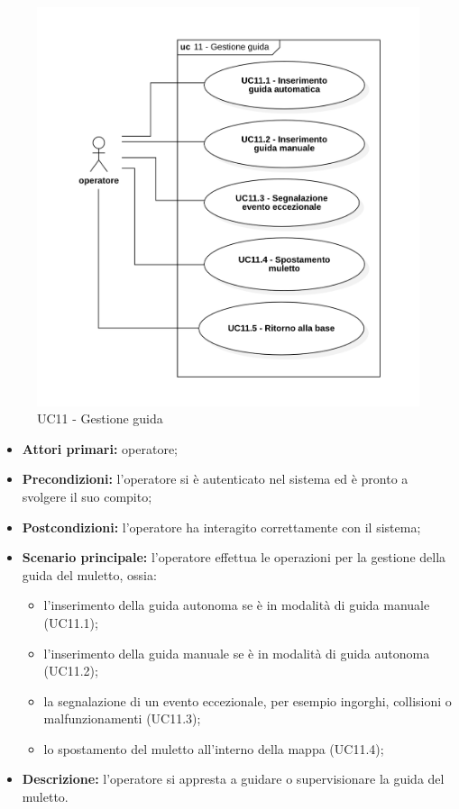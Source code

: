 \begin{figure}[H]
	\centering
	\includegraphics[scale=0.52]{res/images/uc11.png}
	\caption{ UC11 - Gestione guida}
\end{figure}

\begin{itemize}
	\item 	\textbf{Attori primari:} operatore;
	\item 	\textbf{Precondizioni:} l'operatore si è autenticato nel sistema ed è pronto a svolgere il suo compito;
	\item 	\textbf{Postcondizioni:} l'operatore ha interagito correttamente con il sistema; 
	\item 	\textbf{Scenario principale:} l'operatore effettua le operazioni per la gestione della guida del muletto, ossia:
	\begin{itemize}
		\item l'inserimento della guida autonoma se è in modalità di guida manuale (UC11.1);
		\item l'inserimento della guida manuale se è in modalità di guida autonoma (UC11.2);
		\item la segnalazione di un evento eccezionale, per esempio ingorghi, collisioni o malfunzionamenti (UC11.3);
		\item lo spostamento del muletto all'interno della mappa (UC11.4);
	\end{itemize}
	\item 	\textbf{Descrizione:} l'operatore si appresta a guidare o supervisionare la guida del muletto. 

\end{itemize}

